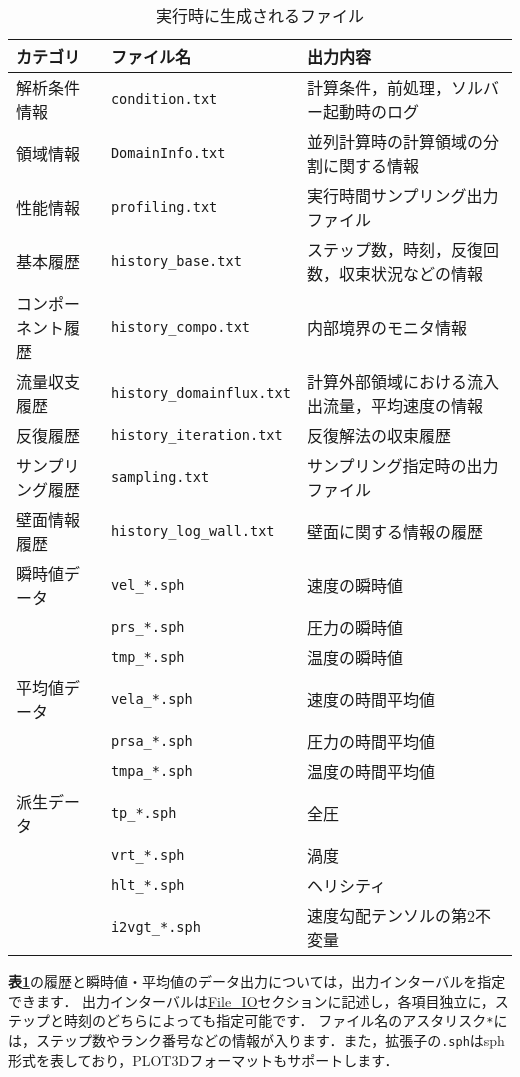 \begin{table}[htdp]
\caption{実行時に生成されるファイル}
\begin{center}
\small
\begin{tabular}{lll}\toprule
カテゴリ & ファイル名 & 出力内容\\ \midrule
解析条件情報 & \verb|condition.txt| & 計算条件，前処理，ソルバー起動時のログ\\
領域情報 & \verb|DomainInfo.txt| & 並列計算時の計算領域の分割に関する情報\\ 
性能情報 & \verb|profiling.txt| & 実行時間サンプリング出力ファイル\\ \hline
基本履歴 & \verb|history_base.txt| & ステップ数，時刻，反復回数，収束状況などの情報\\
コンポーネント履歴 & \verb|history_compo.txt| & 内部境界のモニタ情報\\
流量収支履歴 & \verb|history_domainflux.txt| & 計算外部領域における流入出流量，平均速度の情報\\
反復履歴 & \verb|history_iteration.txt| & 反復解法の収束履歴\\ 
サンプリング履歴 & \verb|sampling.txt| & サンプリング指定時の出力ファイル\\ 
壁面情報履歴 & \verb|history_log_wall.txt| & 壁面に関する情報の履歴\\ \hline
瞬時値データ & \verb|vel_*.sph| & 速度の瞬時値\\
& \verb|prs_*.sph| & 圧力の瞬時値\\
& \verb|tmp_*.sph| & 温度の瞬時値\\
平均値データ & \verb|vela_*.sph| & 速度の時間平均値\\
& \verb|prsa_*.sph| & 圧力の時間平均値\\
& \verb|tmpa_*.sph| & 温度の時間平均値\\
派生データ & \verb|tp_*.sph| & 全圧\\
& \verb|vrt_*.sph| & 渦度\\
& \verb|hlt_*.sph| & ヘリシティ\\
& \verb|i2vgt_*.sph| & 速度勾配テンソルの第2不変量\\ 
\bottomrule
\end{tabular}
\end{center}
\label{tbl:logfiles}
\end{table}

\textbf{表\ref{tbl:logfiles}}の履歴と瞬時値・平均値のデータ出力については，出力インターバルを指定できます．
出力インターバルは\hyperlink{tgt:fileio}{File\_IO}セクションに記述し，各項目独立に，ステップと時刻のどちらによっても指定可能です．
ファイル名のアスタリスク\verb|*|には，ステップ数やランク番号などの情報が入ります．また，拡張子の\verb|.sph|はsph形式を表しており，PLOT3Dフォーマットもサポートします．

